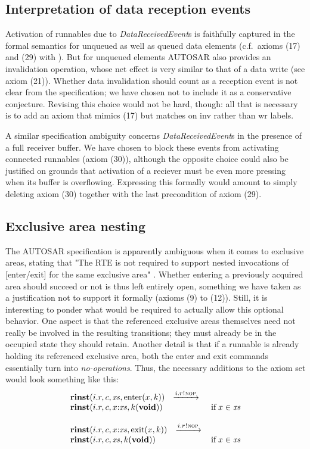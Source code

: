 \documentclass[10pt,conference]{IEEEtran}
\begin{document}
\subsection{Interpretation of data reception events}

Activation of runnables due to \emph{DataReceived\-Event}s is faithfully captured in the formal semantics for unqueued as well as queued data elements (c.f.~axioms (17) and (29) with \cite[ch.~7.5.1.6]{AR:SWC}). But for unqueued elements AUTOSAR also provides an invalidation operation, whose net effect is very similar to that of a data write (see axiom (21)). Whether data invalidation should count as a reception event is not clear from the specification; we have chosen not to include it as a conservative conjecture. Revising this choice would not be hard, though: all that is necessary is to add an axiom that mimics (17) but matches on {\sc inv} rather than {\sc wr} labels.

A similar specification ambiguity concerns \emph{DataReceived\-Event}s in the presence of a full receiver buffer. We have chosen to block these events from activating connected runnables (axiom (30)), although the opposite choice could also be justified on grounds that activation of a reciever must be even more pressing when its buffer is overflowing. Expressing this formally would amount to simply deleting axiom (30) together with the last precondition of axiom (29).


\subsection{Exclusive area nesting} \label{sec:ExclNest}

The AUTOSAR specification is apparently ambiguous when it comes to exclusive areas, stating that "The RTE is not required to support nested invocations of [enter/exit] for the same exclusive area" \cite[ch.~5.6.28-29]{AR:RTE}. Whether entering a previously acquired area should succeed or not is thus left entirely open, something we have taken as a justification not to support it formally (axioms (9) to (12)). Still, it is interesting to ponder what would be required to actually allow this optional behavior. One aspect is that the referenced exclusive areas themselves need not really be involved in the resulting transitions; they must already be in the occupied state they should retain. Another detail is that if a runnable is already holding its referenced exclusive area, both the enter and exit commands essentially turn into \emph{no-operations}. Thus, the necessary additions to the axiom set would look something like this:
$$
\begin{array}{lcll}
		{\Trinst {i.r} c \Xs {\TrteEnter x k}}
		\;\; \red{\Tsay {i.r} \Tnop} \\
		{\Trinst {i.r} c {\Tcons x \Xs} {\Tap k \Tvoid}}
		& \Pif\;x \in \Xs
\\ \\
		{\Trinst {i.r} c {\Tcons x \Xs} {\TrteExit x k}}
		\;\; \red{\Tsay {i.r} \Tnop} \\
		{\Trinst {i.r} c \Xs {\Tap k \Tvoid}}
		& \Pif\;x \in \Xs
\end{array}
$$
\end{document}
